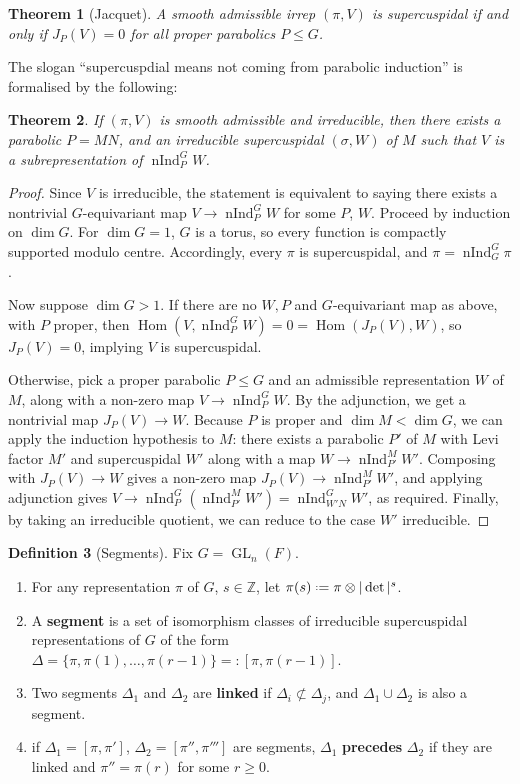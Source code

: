 \documentclass[11pt]{report}
\newcommand{\1}{\mathbbm 1}
\newcommand{\Z}{\mathbb{Z}}
\newcommand*{\defeq}{\mathrel{\vcenter{\baselineskip0.5ex \lineskiplimit0pt
      \hbox{\scriptsize.}\hbox{\scriptsize.}}}%
  =}
\DeclareMathOperator{\nInd}{nInd}
\DeclareMathOperator{\GL}{GL}
\DeclareMathOperator{\Hom}{Hom}
\theoremstyle{plain}
\newtheorem{thm}{Theorem}[section]
\newcounter{ex}
\theoremstyle{definition}
\newtheorem{mydef}[thm]{Definition}
\theoremstyle{remark}
\numberwithin{equation}{section}
\begin{document}
\begin{thm}[Jacquet]
  A smooth admissible irrep $(\pi,V)$ is supercuspidal if and only if
  $J_{P}(V) = 0$ for all proper parabolics $P \le G$.
\end{thm}

The slogan ``supercuspdial means not coming from parabolic induction'' is formalised by the following:
\begin{thm}
  If $(\pi,V)$ is smooth admissible and irreducible, then there exists a
  parabolic $P = MN$, and an irreducible supercuspidal $(\sigma,W)$ of
  $M$ such that $V$ is a subrepresentation of $\nInd^{G}_{P}W$.
\end{thm}
\begin{proof}
  Since $V$ is irreducible, the statement is equivalent to saying
  there exists a nontrivial $G$-equivariant map
  $V \to \nInd_{P}^{G} W$ for some $P$, $W$. Proceed by induction on
  $\dim G$. For $\dim G = 1$, $G$ is a torus, so every function is
  compactly supported modulo centre. Accordingly, every $\pi$ is
  supercuspidal, and $\pi = \nInd_{G}^{G} \pi$.

  Now suppose $\dim G > 1$. If there are no $W,P$ and $G$-equivariant
  map as above, with $P$ proper, then
  $\Hom(V,\nInd_{P}^{G} W) = 0 = \Hom (J_{P}(V),W)$, so
  $J_{P}(V) = 0$, implying $V$ is supercuspidal.

  Otherwise, pick a proper parabolic $P \le G$ and an admissible
  representation $W$ of $M$, along with a non-zero map
  $V \to \nInd_{P}^{G}W$. By the adjunction, we get a nontrivial map
  $J_{P}(V) \to W$. Because $P$ is proper and $\dim M < \dim G$, we can
  apply the induction hypothesis to $M$: there exists a parabolic
  $P'$ of $M$ with Levi factor $M'$ and supercuspidal $W'$ along with
  a map $W \to \nInd_{P'}^{M}W'$. Composing with $J_{P}(V) \to W$ gives a
  non-zero map $J_{P}(V) \to \nInd_{P'}^{M}W'$, and applying adjunction
  gives $V \to \nInd^{G}_{P}(\nInd^{M}_{P'} W') = \nInd_{W'N}^{G} W'$,
  as required. Finally, by taking an irreducible quotient, we can
  reduce to the case $W'$ irreducible.
\end{proof}

\begin{mydef}[Segments]
Fix $G = \GL_{n}(F)$. 
\begin{enumerate}
\item For any representation $\pi$ of $G$, $s \in \Z$, let
  $\pi(s) \defeq \pi \otimes |\det |^{s}$.
\item A \textbf{segment} is a set of isomorphism classes of
  irreducible supercuspidal representations of $G$ of the form
  $\Delta = \{\pi,\pi(1),\ldots, \pi(r-1)\} =: [\pi,\pi(r-1)]$.
\item Two segments $\Delta_{1}$ and $\Delta_{2}$ are \textbf{linked} if
  $\Delta_{i}\not \subset \Delta_{j}$, and $\Delta_{1} \cup \Delta_{2}$ is also a segment.
\item if $\Delta_{1} = [\pi,\pi']$, $\Delta_{2} = [\pi'',\pi''']$ are segments,
  $\Delta_{1}$ \textbf{precedes} $\Delta_{2}$ if they are linked and $\pi'' = \pi(r)$ for some $r \ge 0$. 
\end{enumerate}
\end{mydef}
\end{document}

